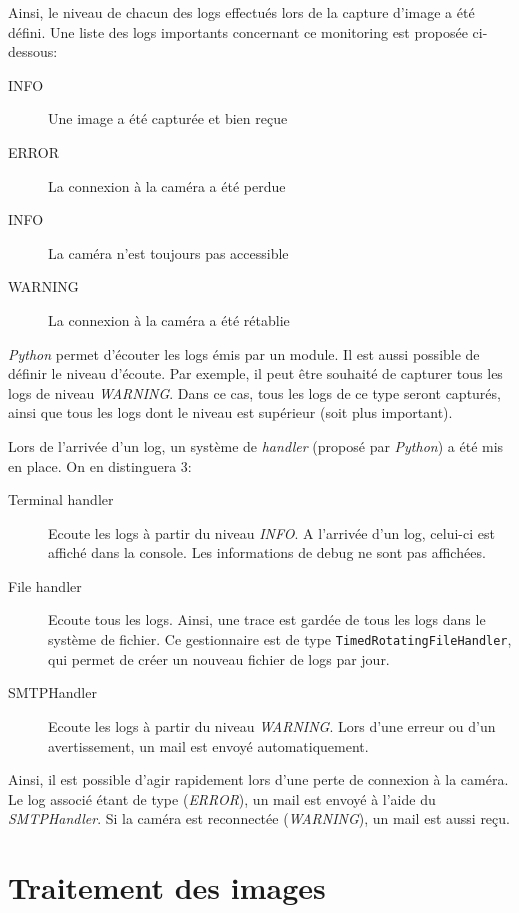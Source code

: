 Ainsi, le niveau de chacun des logs effectués lors de la capture d'image a été défini. Une liste des logs importants concernant ce monitoring est proposée ci-dessous:
\begin{description}
    \item[INFO] Une image a été capturée et bien reçue
    \item[ERROR] La connexion à la caméra a été perdue
    \item[INFO] La caméra n'est toujours pas accessible
    \item[WARNING] La connexion à la caméra a été rétablie
\end{description}

\textit{Python} permet d'écouter les logs émis par un module. Il est aussi possible de définir le niveau d'écoute. Par exemple, il peut être souhaité de capturer tous les logs de niveau \textit{WARNING}. Dans ce cas, tous les logs de ce type seront capturés, ainsi que tous les logs dont le niveau est supérieur (soit plus important). 

Lors de l'arrivée d'un log, un système de \textit{handler} (proposé par \textit{Python}) a été mis en place. On en distinguera 3:
\begin{description}
    \item[Terminal handler] Ecoute les logs à partir du niveau \textit{INFO}. A l'arrivée d'un log, celui-ci est affiché dans la console. Les informations de debug ne sont pas affichées.
    \item[File handler] Ecoute tous les logs. Ainsi, une trace est gardée de tous les logs dans le système de fichier. Ce gestionnaire est de type \lstinline[columns=fixed]{TimedRotatingFileHandler}, qui permet de créer un nouveau fichier de logs par jour. 
    \item[SMTPHandler] Ecoute les logs à partir du niveau \textit{WARNING}. Lors d'une erreur ou d'un avertissement, un mail est envoyé automatiquement.
\end{description}

Ainsi, il est possible d'agir rapidement lors d'une perte de connexion à la caméra. Le log associé étant de type (\textit{ERROR}), un mail est envoyé à l'aide du \textit{SMTPHandler}. Si la caméra est reconnectée (\textit{WARNING}), un mail est aussi reçu.

\section{Traitement des images}\label{realisation.traitement}

